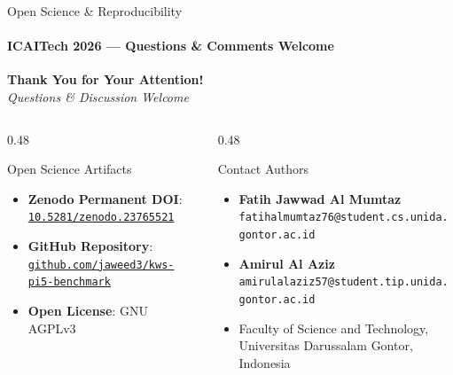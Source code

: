 \documentclass[aspectratio=169]{beamer}
\begin{document}
\begin{frame}{Open Science \& Reproducibility}
\framesubtitle{ICAITech 2026 — Questions \& Comments Welcome}
\vspace{-0.2em}
\begin{center}
  {\Large\textbf{Thank You for Your Attention!}}\\[0.3ex]
  {\small\textit{Questions \& Discussion Welcome}}
\end{center}

\vspace{0.1em}
\begin{columns}[T]
  \begin{column}{0.48\textwidth}
    \begin{exampleblock}{Open Science Artifacts}
      \begin{itemize}\small
        \item \textbf{Zenodo Permanent DOI}:\\
          {\footnotesize\href{https://doi.org/10.5281/zenodo.23765521}{\texttt{10.5281/zenodo.23765521}}}
        \item \textbf{GitHub Repository}:\\
          {\footnotesize\href{https://github.com/jaweed3/kws-pi5-benchmark}{\texttt{github.com/jaweed3/kws-pi5-benchmark}}}
        \item \textbf{Open License}: GNU AGPLv3
      \end{itemize}
    \end{exampleblock}
  \end{column}

  \begin{column}{0.48\textwidth}
    \begin{block}{Contact Authors}
      \begin{itemize}\small
        \item \textbf{Fatih Jawwad Al Mumtaz}\\
          \texttt{\scriptsize fatihalmumtaz76@student.cs.unida.gontor.ac.id}
        \item \textbf{Amirul Al Aziz}\\
          \texttt{\scriptsize amirulalaziz57@student.tip.unida.gontor.ac.id}
        \item {\scriptsize Faculty of Science and Technology,\\Universitas Darussalam Gontor, Indonesia}
      \end{itemize}
    \end{block}
  \end{column}
\end{columns}
\end{frame}
\end{document}
